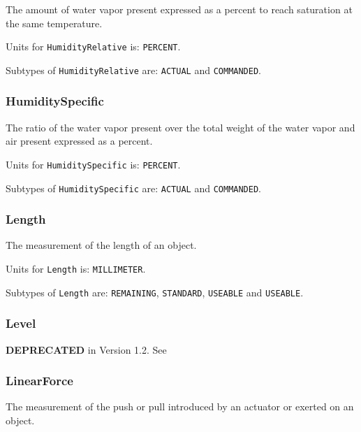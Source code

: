 The amount of water vapor present expressed as a percent to reach saturation at the same temperature.


Units for \texttt{HumidityRelative} is: \texttt{PERCENT}.


Subtypes of \texttt{HumidityRelative} are: \texttt{ACTUAL} and \texttt{COMMANDED}. 
\FloatBarrier

\subsubsection{HumiditySpecific}
  \label{sec:HumiditySpecific}



The ratio of the water vapor present over the total weight of the water vapor and air present expressed as a percent.



Units for \texttt{HumiditySpecific} is: \texttt{PERCENT}.


Subtypes of \texttt{HumiditySpecific} are: \texttt{ACTUAL} and \texttt{COMMANDED}. 
\FloatBarrier

\subsubsection{Length}
  \label{sec:Length}



The measurement of the length of an object.


Units for \texttt{Length} is: \texttt{MILLIMETER}.


Subtypes of \texttt{Length} are: \texttt{REMAINING}, \texttt{STANDARD}, \texttt{USEABLE} and \texttt{USEABLE}. 
\FloatBarrier

\subsubsection{Level}
  \label{sec:Level}



\textbf{DEPRECATED} in Version 1.2.  See 

\FloatBarrier

\subsubsection{LinearForce}
  \label{sec:LinearForce}



The measurement of the push or pull introduced by an actuator or exerted on an object.


